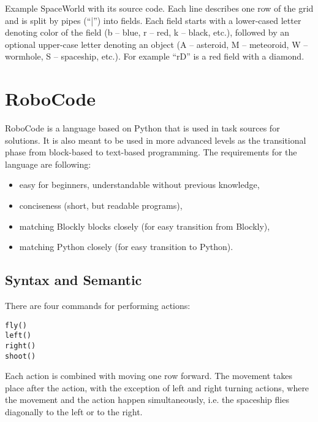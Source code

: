 %
{Example SpaceWorld with its source code.
Each line describes one row of the grid
and is split by pipes (``|'') into fields.
Each field starts with a lower-cased letter denoting color of the field
(b -- blue, r -- red, k -- black, etc.),
followed by an optional upper-case letter denoting an object
(A -- asteroid, M -- meteoroid, W -- wormhole, S -- spaceship, etc.).
For example ``rD'' is a red field with a diamond.}



\section{RoboCode}

RoboCode is a language based on Python that is used in task sources for solutions.
It is also meant to be used in more advanced levels as the transitional phase
from block-based to text-based programming.
The requirements for the language are following:
\begin{itemize}
\item easy for beginners, understandable without previous knowledge,
\item conciseness (short, but readable programs),
\item matching Blockly blocks closely (for easy transition from Blockly),
\item matching Python closely (for easy transition to Python).
\end{itemize}

\subsection{Syntax and Semantic}
\label{sec:syntax-semantic}


There are four commands for performing actions:
\begin{lstlisting}
fly()
left()
right()
shoot()
\end{lstlisting}
Each action is combined with moving one row forward.
The movement takes place after the action, with the exception of left and right turning actions, where the movement and the action happen simultaneously,
i.e. the spaceship flies diagonally to the left or to the right.

